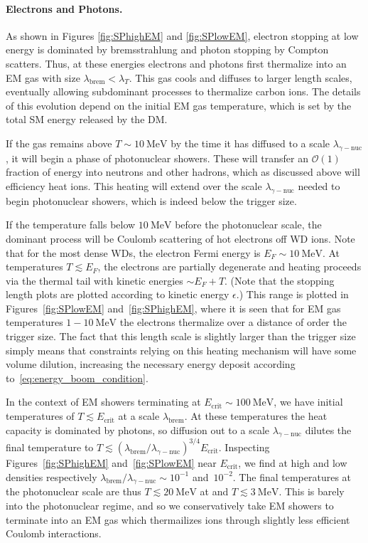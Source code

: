\documentclass[twocolumn, preprintnumbers,amsmath,amssymb,prd, superscriptaddress]{revtex4}
\newcommand{\OO}{\mathcal{O}}
\newcommand{\MeV}{\text{MeV}}
\begin{document}
\paragraph{Electrons and Photons.}
As shown in  Figures \ref{fig:SPhighEM} and \ref{fig:SPlowEM}, electron stopping at low energy is dominated by bremsstrahlung and photon stopping by Compton scatters.
Thus, at these energies electrons and photons first thermalize into an EM gas with size $\lambda_\text{brem} < \lambda_T$.
This gas cools and diffuses to larger length scales, eventually allowing subdominant processes to thermalize carbon ions.
The details of this evolution depend on the initial EM gas temperature, which is set by the total SM energy released by the DM.

If the gas remains above $T\sim10~\MeV$ by the time it has diffused to a scale $\lambda_{\gamma-\text{nuc}}$, it will begin a phase of photonuclear showers.
These will transfer an $\OO(1)$ fraction of energy into neutrons and other hadrons, which as discussed above will efficiency heat ions.
This heating will extend over the scale $\lambda_{\gamma-\text{nuc}}$ needed to begin photonuclear showers, which is indeed below the trigger size.

If the temperature falls below $10~\MeV$ before the photonuclear scale, the dominant process will be Coulomb scattering of hot electrons off WD ions.
Note that for the most dense WDs, the electron Fermi energy is $E_F \sim 10~\MeV$. At temperatures $T\lesssim E_F$, the electrons are partially degenerate and heating proceeds via the thermal tail with kinetic energies $\sim E_F + T$.
(Note that the stopping length plots are plotted according to kinetic energy $\epsilon$.)
This range is plotted in Figures~\ref{fig:SPlowEM} and~\ref{fig:SPhighEM}, where it is seen that for EM gas temperatures $1-10~\MeV$ the electrons thermalize over a distance of order the trigger size.
The fact that this length scale is slightly larger than the trigger size simply means that constraints relying on this heating mechanism will have some volume dilution, increasing the necessary energy deposit according to~\eqref{eq:energy_boom_condition}.

In the context of EM showers terminating at $E_\text{crit}\sim100~\MeV$, we have initial temperatures of $T \lesssim E_\text{crit}$ at a scale $\lambda_\text{brem}$.
At these temperatures the heat capacity is dominated by photons, so diffusion out to a scale $\lambda_{\gamma-\text{nuc}}$ dilutes the final temperature to $T \lesssim (\lambda_\text{brem} / \lambda_{\gamma-\text{nuc}})^{3/4} E_\text{crit}$.
Inspecting Figures~\ref{fig:SPhighEM} and~\ref{fig:SPlowEM} near $E_\text{crit}$, we find at high and low densities respectively $\lambda_\text{brem} / \lambda_{\gamma-\text{nuc}} \sim 10^{-1}$ and~$10^{-2}$.
The final temperatures at the photonuclear scale are thus $T \lesssim 20~\text{MeV}$ at and $T \lesssim 3~\text{MeV}$.
This is barely into the photonuclear regime, and so we conservatively take EM showers to terminate into an EM gas which thermailizes ions through slightly less efficient Coulomb interactions. 
\end{document}
